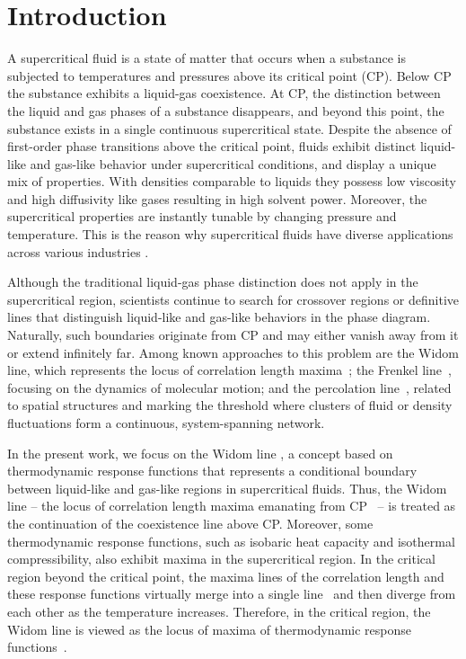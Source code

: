 \section{Introduction}
A supercritical fluid is a state of matter that occurs when a substance is subjected to temperatures and pressures above its critical point (CP). Below CP the substance exhibits a liquid-gas coexistence. At CP, the distinction between the liquid and gas phases of a substance disappears, and beyond this point, the substance exists in a single continuous supercritical state. Despite the absence of first-order phase transitions above the critical point, fluids exhibit distinct liquid-like and gas-like behavior under supercritical conditions, and display a unique mix of properties. With densities comparable to liquids they possess low viscosity and high diffusivity like gases resulting in high solvent power. Moreover, the supercritical properties are instantly tunable by changing pressure and temperature. This is the reason why supercritical fluids have diverse applications across various industries \cite{KMLetal14}.

Although the traditional liquid-gas phase distinction does not apply in the supercritical region, scientists continue to search for crossover regions or definitive lines that distinguish liquid-like and gas-like behaviors in the phase diagram. Naturally, such boundaries originate from CP and may either vanish away from it or extend infinitely far. Among known approaches to this problem are the Widom line, which represents the locus of correlation length maxima~\cite{FW69}; the Frenkel line~\cite{BGMetal17}, focusing on the dynamics of molecular motion; and the percolation line~\cite{CKS01}, related to spatial structures and marking the threshold where clusters of fluid or density fluctuations form a continuous, system-spanning network.

In the present work, we focus on the Widom line \cite{XKBetal05,MS10,AKM17}, a concept based on thermodynamic response functions that represents a conditional boundary between liquid-like and gas-like regions in supercritical fluids. Thus, the Widom line \--- the locus of correlation length maxima emanating from CP~\cite{XKBetal05} \--- is treated as the continuation of the coexistence line above CP. Moreover, some thermodynamic response functions, such as isobaric heat capacity and isothermal compressibility, also exhibit maxima in the supercritical region. In the critical region beyond the critical point, the maxima lines of the correlation length and these response functions virtually merge into a single line~\cite{AKM17} and then diverge from each other as the temperature increases. Therefore, in the critical region, the Widom line is viewed as the locus of maxima of thermodynamic response functions~\cite{Proctor20}.

